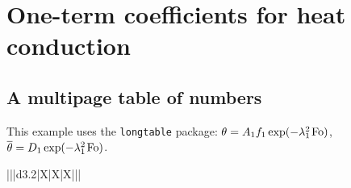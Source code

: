 \chapter{One-term coefficients for heat conduction}

\section{A multipage table of numbers}
This example uses the \texttt{longtable} package: $\theta = A_1 f_1 \exp(-\lambda_1^2\mkern2mu\textrm{Fo})$, $\overline{\theta} = D_1 \exp(-\lambda_1^2\mkern2mu\textrm{Fo})$.


{\footnotesize
\renewcommand{\doublerulesep}{0pt}%
%

\begin{longtable}{|||d{3.2}|X|X|X|||}

\caption{One-term coefficients for one-dimensional heat conduction with a convective boundary condition. Data follow H. D. Baehr and K. Stephan~\cite{baehr1998}.}%


\end{longtable}}

